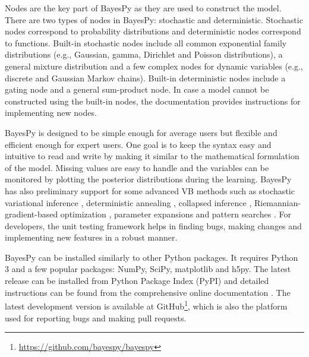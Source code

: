 \documentclass[twoside,11pt]{article}
\begin{document}
Nodes are the key part of BayesPy as they are used to construct the model.
There are two types of nodes in BayesPy: stochastic and deterministic.
Stochastic nodes correspond to probability distributions and deterministic nodes
correspond to functions.  Built-in stochastic nodes include all common
exponential family distributions (e.g., Gaussian, gamma, Dirichlet and Poisson
distributions), a general mixture distribution and a few complex nodes for
dynamic variables (e.g., discrete and Gaussian Markov chains).  Built-in
deterministic nodes include a gating node and a general sum-product node.  In
case a model cannot be constructed using the built-in nodes, the documentation
provides instructions for implementing new nodes.



BayesPy is designed to be simple enough for average users but flexible and
efficient enough for expert users.  One goal is to keep the syntax easy and
intuitive to read and write by making it similar to the mathematical formulation
of the model.  Missing values are easy to handle and the variables can be
monitored by plotting the posterior distributions during the learning.  BayesPy
has also preliminary support for some advanced VB methods such as stochastic
variational inference \citep{Hoffman:2013}, deterministic annealing
\citep{Katahira:2008}, collapsed inference \citep{Hensman:2012},
Riemannian-gradient-based optimization \citep{Honkela:2010}, parameter
expansions \citep{Qi:2007} and pattern searches \citep{Honkela:2003}.  For
developers, the unit testing framework helps in finding bugs, making changes and
implementing new features in a robust manner.



BayesPy can be installed similarly to other Python packages.  It requires Python
3 and a few popular packages: NumPy, SciPy, matplotlib and h5py.  The latest
release can be installed from Python Package Index (PyPI) and detailed
instructions can be found from the comprehensive online documentation
\citep{bayespy.org}.  The latest development version is available at
GitHub\footnote{\url{https://github.com/bayespy/bayespy}}, which is also the
platform used for reporting bugs and making pull requests.







\end{document}
